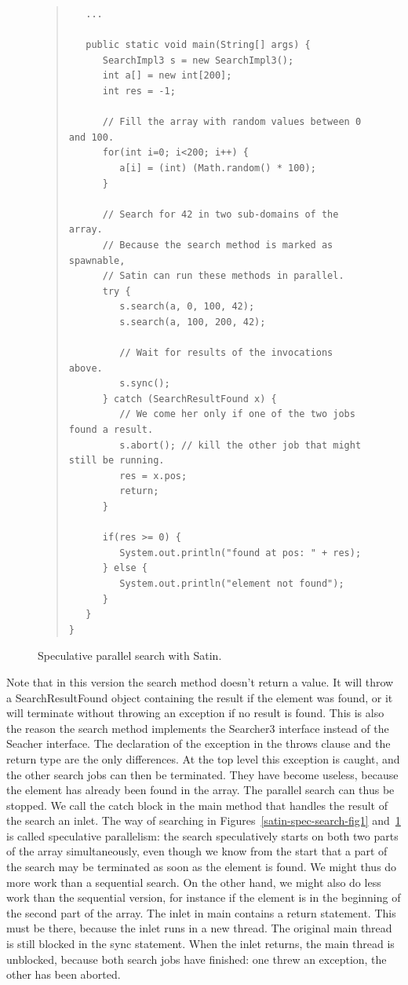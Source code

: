 \documentclass[10pt]{article}
\begin{document}
\begin{figure}[t!]
\small{
\begin{quote}
\begin{verbatim}
   ...

   public static void main(String[] args) {
      SearchImpl3 s = new SearchImpl3();
      int a[] = new int[200];
      int res = -1;

      // Fill the array with random values between 0 and 100.
      for(int i=0; i<200; i++) {
         a[i] = (int) (Math.random() * 100);
      }

      // Search for 42 in two sub-domains of the array.
      // Because the search method is marked as spawnable,
      // Satin can run these methods in parallel.
      try {
         s.search(a, 0, 100, 42);
         s.search(a, 100, 200, 42);

         // Wait for results of the invocations above.
         s.sync();
      } catch (SearchResultFound x) {
         // We come her only if one of the two jobs found a result.
         s.abort(); // kill the other job that might still be running.
         res = x.pos;
         return;
      }

      if(res >= 0) {
         System.out.println("found at pos: " + res);
      } else {
         System.out.println("element not found");
      }
   }
}
\end{verbatim}
\end{quote}
}
\caption{Speculative parallel search with Satin.}
\label{satin-spec-search-fig2}
\end{figure}

Note that in this version the search method doesn't return a value. It
will throw a SearchResultFound object containing the result if the
element was found, or it will terminate without throwing an exception
if no result is found. This is also the reason the search method
implements the Searcher3 interface instead of the Seacher
interface. The declaration of the exception in the throws clause and
the return type are the only differences.  At the top level this
exception is caught, and the other search jobs can then be
terminated. They have become useless, because the element has already
been found in the array. The parallel search can thus be stopped. We
call the catch block in the main method that handles the result of the
search an inlet.  The way of searching in Figures~\ref{satin-spec-search-fig1} and~\ref{satin-spec-search-fig2} is called
speculative parallelism: the search speculatively starts on both two
parts of the array simultaneously, even though we know from the start
that a part of the search may be terminated as soon as the element is
found. We might thus do more work than a sequential search. On the
other hand, we might also do less work than the sequential version,
for instance if the element is in the beginning of the second part of
the array.  The inlet in main contains a return statement. This must
be there, because the inlet runs in a new thread. The original main
thread is still blocked in the sync statement. When the inlet returns,
the main thread is unblocked, because both search jobs have finished:
one threw an exception, the other has been aborted.  
\end{document}
